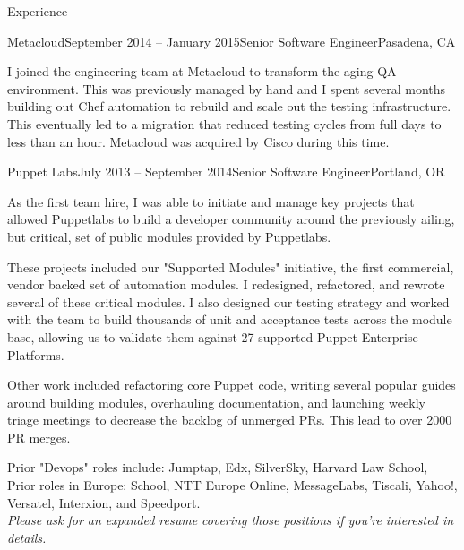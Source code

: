 \documentclass{resume} %
\begin{document}
\begin{rSection}{Experience}
\begin{rSubsection}{Metacloud}{September 2014 -- January 2015}{Senior Software Engineer}{Pasadena, CA}
\item[] I joined the engineering team at Metacloud to transform the aging QA
  environment.  This was previously managed by hand and I spent several months
  building out Chef automation to rebuild and scale out the testing
  infrastructure.  This eventually led to a migration that reduced testing
  cycles from full days to less than an hour.  Metacloud was acquired by Cisco
  during this time.

\end{rSubsection}

\begin{rSubsection}{Puppet Labs}{July 2013 -- September 2014}{Senior Software Engineer}{Portland, OR}

\item[] As the first team hire, I was able to initiate and manage key projects
  that allowed Puppetlabs to build a developer community around the previously
  ailing, but critical, set of public modules provided by Puppetlabs.

These projects included our "Supported Modules" initiative, the first
  commercial, vendor backed set of  automation modules.  I redesigned,
  refactored, and rewrote several of these critical modules.  I also designed
  our testing strategy and worked with the team to build thousands of unit and
  acceptance tests across the module base, allowing us to validate them against
  27 supported Puppet Enterprise Platforms.

Other work included refactoring core Puppet code, writing several popular
  guides around building modules, overhauling documentation, and launching
  weekly triage meetings to decrease the backlog of unmerged PRs.  This lead to
  over 2000 PR merges.

\end{rSubsection}

\begin{center}
Prior "Devops" roles include: Jumptap, Edx, SilverSky, Harvard Law School,\\
Prior roles in Europe: School, NTT Europe Online, MessageLabs, Tiscali, Yahoo!, Versatel, Interxion, and Speedport.\\
\textit{Please ask for an expanded resume covering those positions if you're interested in details.}
\end{center}

\end{rSection}
\end{document}
